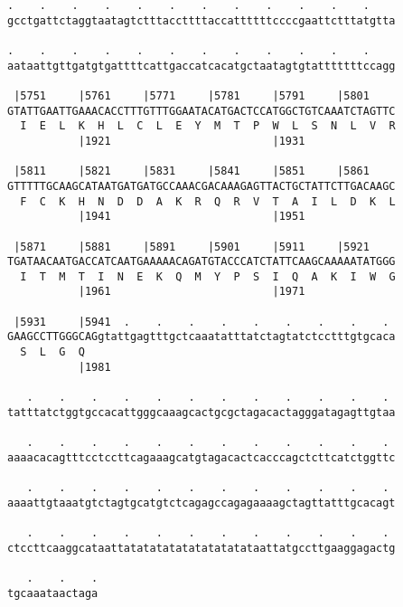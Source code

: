 \documentclass{article}
\begin{document}
\begin{Verbatim}
.    .    .    .    .    .    .    .    .    .    .    .    
gcctgattctaggtaatagtctttaccttttaccattttttccccgaattctttatgtta
                                                            
.    .    .    .    .    .    .    .    .    .    .    .    
aataattgttgatgtgattttcattgaccatcacatgctaatagtgtatttttttccagg
                                                            
 |5751     |5761     |5771     |5781     |5791     |5801    
GTATTGAATTGAAACACCTTTGTTTGGAATACATGACTCCATGGCTGTCAAATCTAGTTC
  I  E  L  K  H  L  C  L  E  Y  M  T  P  W  L  S  N  L  V  R
           |1921                         |1931              
  
 |5811     |5821     |5831     |5841     |5851     |5861    
GTTTTTGCAAGCATAATGATGATGCCAAACGACAAAGAGTTACTGCTATTCTTGACAAGC
  F  C  K  H  N  D  D  A  K  R  Q  R  V  T  A  I  L  D  K  L
           |1941                         |1951              
  
 |5871     |5881     |5891     |5901     |5911     |5921    
TGATAACAATGACCATCAATGAAAAACAGATGTACCCATCTATTCAAGCAAAAATATGGG
  I  T  M  T  I  N  E  K  Q  M  Y  P  S  I  Q  A  K  I  W  G
           |1961                         |1971              
  
 |5931     |5941  .    .    .    .    .    .    .    .    . 
GAAGCCTTGGGCAGgtattgagtttgctcaaatatttatctagtatctcctttgtgcaca
  S  L  G  Q                                                
           |1981                                            
  
   .    .    .    .    .    .    .    .    .    .    .    . 
tatttatctggtgccacattgggcaaagcactgcgctagacactagggatagagttgtaa
                                                            
   .    .    .    .    .    .    .    .    .    .    .    . 
aaaacacagtttcctccttcagaaagcatgtagacactcacccagctcttcatctggttc
                                                            
   .    .    .    .    .    .    .    .    .    .    .    . 
aaaattgtaaatgtctagtgcatgtctcagagccagagaaaagctagttatttgcacagt
                                                            
   .    .    .    .    .    .    .    .    .    .    .    . 
ctccttcaaggcataattatatatatatatatatatataattatgccttgaaggagactg
                                                            
   .    .    .
tgcaaataactaga
              
              
 

\end{Verbatim}
\end{document}
